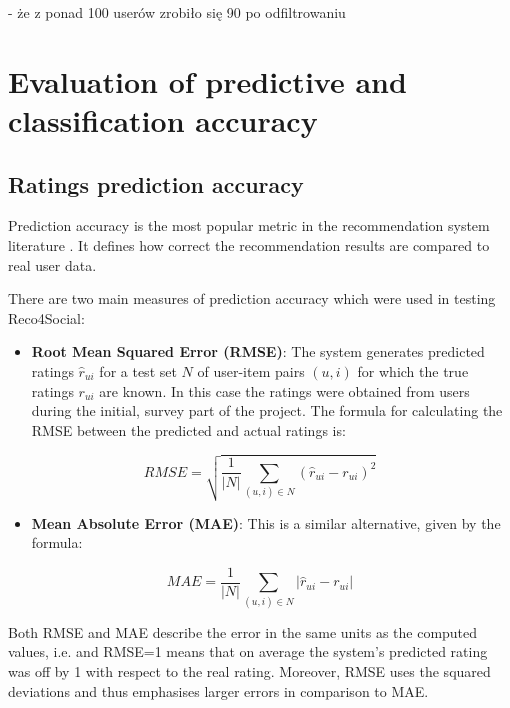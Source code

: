 \documentclass[12pt]{report}
\begin{document}
- że z ponad 100 userów zrobiło się 90 po odfiltrowaniu

\section{Evaluation of predictive and classification accuracy}

\subsection{Ratings prediction accuracy}

Prediction accuracy is the most popular metric in the recommendation system literature \cite{eval_microsoft}. It defines how correct the recommendation results are compared to real user data. 

There are two main measures of prediction accuracy which were used in testing Reco4Social:
\begin{itemize}
\item {\bf Root Mean Squared Error (RMSE)}: The system generates predicted ratings $\hat{r}_{ui}$ for a test set $N$ of user-item pairs $(u,i)$ for which the true ratings $r_{ui}$ are known. In this case the ratings were obtained from users during the initial, survey part of the project. The formula for calculating the RMSE between the predicted and actual ratings is:
\end{itemize}

\begin{equation}
RMSE = \sqrt{\frac{1}{|N|} \displaystyle\sum_{(u,i) \in N} (\hat{r}_{ui} - r_{ui})^2 }
\label{eq.rmse}
\end{equation}
\hbox{}

\begin{itemize}
\item {\bf Mean Absolute Error (MAE)}: This is a similar alternative, given by the formula:
\end{itemize}

\begin{equation}
MAE = \frac{1}{|N|} \displaystyle\sum_{(u,i) \in N} |\hat{r}_{ui} - r_{ui}|
\label{eq.mae}
\end{equation}
\hbox{}

Both RMSE and MAE describe the error in the same units as the computed values, i.e. and RMSE=1 means that on average the system's predicted rating was off by 1 with respect to the real rating. Moreover, RMSE uses the squared deviations and thus emphasises larger errors in comparison to MAE.
\end{document}
